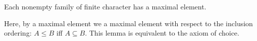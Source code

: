 \documentclass[12pt]{article}
\begin{document}
Each nonempty family of finite character has a maximal element.

Here, by a maximal element we  a maximal element with respect to the inclusion ordering: $A\leq B$ iff $A\subseteq B$. This lemma is equivalent to the axiom of choice.
\end{document}
